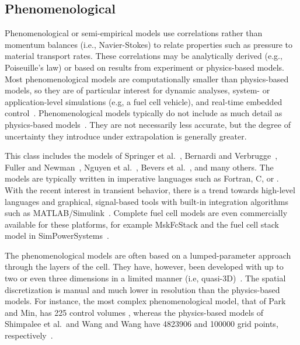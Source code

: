 

\subsection{Phenomenological}
\label{sec:PhenomenologicalFC}

Phenomenological or semi-empirical  models use correlations rather than momentum balances (i.e., Navier-Stokes) to relate properties such as pressure to material transport rates.  These correlations may be analytically derived (e.g., Poiseuille's law) or based on results from experiment or physics-based models.   %
Most phenomenological models are computationally smaller than physics-based models, so they are of particular interest for dynamic analyses, system- or application-level simulations (e.g, a fuel cell vehicle), and real-time embedded control~\cite{McCain2006}.  Phenomenological  models typically do not include as much detail as physics-based  models~\cite{Haraldsson2004}.  They are not necessarily less accurate, but the degree of uncertainty they introduce under extrapolation is generally greater.

This class includes the models of Springer et al.~\cite{Springer1993, Springer1991}, Bernardi and Verbrugge~\cite{Bernardi1991, Bernardi1992}, Fuller and Newman~\cite{Fuller1993}, Nguyen et al.~\cite{Natarajan2001, Nguyen1993}, Bevers et al.~\cite{Bevers1997}, and many others.  The models are typically written in imperative languages such as Fortran, C, or .  With the recent interest in transient behavior, there is a trend towards high-level languages and graphical, signal-based tools with built-in integration algorithms such as MATLAB\slash{}Simulink~\cite{MATLABSimulink2007A}.  Complete fuel cell models are even commercially available for these platforms, for example MskFcStack and the fuel cell stack model in SimPowerSystems~\cite{LMSFC, SimPowerSystemsFC}.

The phenomenological models are often based on a  lumped-parameter approach through the layers of the cell.  They have, however, been developed with up to two or even three dimensions in a limited manner (i.e, quasi-3D)~\cite{Park2012}.  The spatial discretization is manual and much lower in resolution than the physics-based models.  For instance, the most complex phenomenological model, that of Park and Min, has 225 control volumes \cite{Park2012}, whereas the physics-based models of Shimpalee et al.\ and Wang and Wang have \num{4823906} and \num{100000} grid points, respectively~\cite{Shimpalee2009, Wang2006}.

